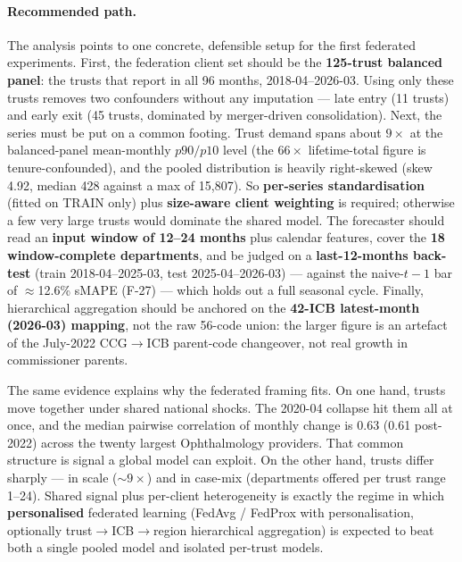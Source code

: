 \documentclass[11pt,a4paper]{article}
\begin{document}
\paragraph{Recommended path.} The analysis points to one concrete, defensible setup for the first federated experiments. First, the federation client set should be the \textbf{125-trust balanced panel}: the trusts that report in all 96 months, 2018-04--2026-03. Using only these trusts removes two confounders without any imputation --- late entry (11 trusts) and early exit (45 trusts, dominated by merger-driven consolidation). Next, the series must be put on a common footing. Trust demand spans about $9\times$ at the balanced-panel mean-monthly $p90/p10$ level (the $66\times$ lifetime-total figure is tenure-confounded), and the pooled distribution is heavily right-skewed (skew 4.92, median 428 against a max of 15{,}807). So \textbf{per-series standardisation} (fitted on TRAIN only) plus \textbf{size-aware client weighting} is required; otherwise a few very large trusts would dominate the shared model. The forecaster should read an \textbf{input window of 12--24 months} plus calendar features, cover the \textbf{18 window-complete departments}, and be judged on a \textbf{last-12-months back-test} (train 2018-04--2025-03, test 2025-04--2026-03) --- against the naive-$t-1$ bar of $\approx$12.6\% sMAPE (F-27) --- which holds out a full seasonal cycle. Finally, hierarchical aggregation should be anchored on the \textbf{42-ICB latest-month (2026-03) mapping}, not the raw 56-code union: the larger figure is an artefact of the July-2022 CCG$\rightarrow$ICB parent-code changeover, not real growth in commissioner parents.

The same evidence explains why the federated framing fits. On one hand, trusts move together under shared national shocks. The 2020-04 collapse hit them all at once, and the median pairwise correlation of monthly change is 0.63 (0.61 post-2022) across the twenty largest Ophthalmology providers. That common structure is signal a global model can exploit. On the other hand, trusts differ sharply --- in scale ($\sim$$9\times$) and in case-mix (departments offered per trust range 1--24). Shared signal plus per-client heterogeneity is exactly the regime in which \textbf{personalised} federated learning (FedAvg / FedProx with personalisation, optionally trust$\rightarrow$ICB$\rightarrow$region hierarchical aggregation) is expected to beat both a single pooled model and isolated per-trust models.
\end{document}
